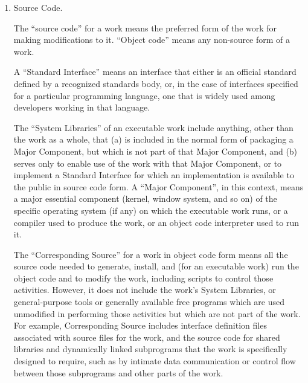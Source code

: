 \documentclass[10pt,a4paper,ngerman,titlepage,tocindentauto]{article}
\begin{document}
\begin{multicols}{3}
{\begin{enumerate}
						To ``convey'' a work means any kind of propagation that enables other
						parties to make or receive copies.  Mere interaction with a user through
						a computer network, with no transfer of a copy, is not conveying.

						An interactive user interface displays ``Appropriate Legal Notices''
						to the extent that it includes a convenient and prominently visible
						feature that (1) displays an appropriate copyright notice, and (2)
						tells the user that there is no warranty for the work (except to the
						extent that warranties are provided), that licensees may convey the
						work under this License, and how to view a copy of this License.  If
						the interface presents a list of user commands or options, such as a
						menu, a prominent item in the list meets this criterion.

						\item Source Code.

						The ``source code'' for a work means the preferred form of the work
						for making modifications to it.  ``Object code'' means any non-source
						form of a work.

						A ``Standard Interface'' means an interface that either is an official
						standard defined by a recognized standards body, or, in the case of
						interfaces specified for a particular programming language, one that
						is widely used among developers working in that language.

						The ``System Libraries'' of an executable work include anything, other
						than the work as a whole, that (a) is included in the normal form of
						packaging a Major Component, but which is not part of that Major
						Component, and (b) serves only to enable use of the work with that
						Major Component, or to implement a Standard Interface for which an
						implementation is available to the public in source code form.  A
						``Major Component'', in this context, means a major essential component
						(kernel, window system, and so on) of the specific operating system
						(if any) on which the executable work runs, or a compiler used to
						produce the work, or an object code interpreter used to run it.

						The ``Corresponding Source'' for a work in object code form means all
						the source code needed to generate, install, and (for an executable
						work) run the object code and to modify the work, including scripts to
						control those activities.  However, it does not include the work's
						System Libraries, or general-purpose tools or generally available free
						programs which are used unmodified in performing those activities but
						which are not part of the work.  For example, Corresponding Source
						includes interface definition files associated with source files for
						the work, and the source code for shared libraries and dynamically
						linked subprograms that the work is specifically designed to require,
						such as by intimate data communication or control flow between those
						subprograms and other parts of the work.


\end{enumerate}}
\end{multicols}
\end{document}
